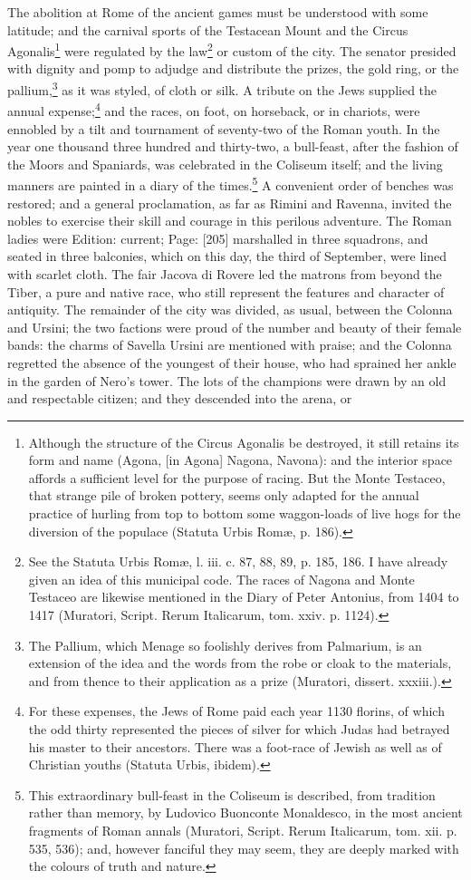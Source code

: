 The abolition at Rome of the ancient games must be understood with some latitude; and the carnival sports of the Testacean Mount and the Circus Agonalis\footnote{Although the structure of the Circus Agonalis be destroyed, it still retains its form and name (Agona, [in Agona] Nagona, Navona): and the interior space affords a sufficient level for the purpose of racing. But the Monte Testaceo, that strange pile of broken pottery, seems only adapted for the annual practice of hurling from top to bottom some waggon-loads of live hogs for the diversion of the populace (Statuta Urbis Romæ, p. 186).} were regulated by the law\footnote{See the Statuta Urbis Romæ, l. iii. c. 87, 88, 89, p. 185, 186. I have already given an idea of this municipal code. The races of Nagona and Monte Testaceo are likewise mentioned in the Diary of Peter Antonius, from 1404 to 1417 (Muratori, Script. Rerum Italicarum, tom. xxiv. p. 1124).} or custom of the city. The senator presided with dignity and pomp to adjudge and distribute the prizes, the gold ring, or the pallium,\footnote{The Pallium, which Menage so foolishly derives from Palmarium, is an extension of the idea and the words from the robe or cloak to the materials, and from thence to their application as a prize (Muratori, dissert. xxxiii.).} as it was styled, of cloth or silk. A tribute on the Jews supplied the annual expense;\footnote{For these expenses, the Jews of Rome paid each year 1130 florins, of which the odd thirty represented the pieces of silver for which Judas had betrayed his master to their ancestors. There was a foot-race of Jewish as well as of Christian youths (Statuta Urbis, ibidem).} and the races, on foot, on horseback, or in chariots, were ennobled by a tilt and tournament of seventy-two of the Roman youth. In the year one thousand three hundred and thirty-two, a bull-feast, after the fashion of the Moors and Spaniards, was celebrated in the Coliseum itself; and the living manners are painted in a diary of the times.\footnote{This extraordinary bull-feast in the Coliseum is described, from tradition rather than memory, by Ludovico Buonconte Monaldesco, in the most ancient fragments of Roman annals (Muratori, Script. Rerum Italicarum, tom. xii. p. 535, 536); and, however fanciful they may seem, they are deeply marked with the colours of truth and nature.} A convenient order of benches was restored; and a general proclamation, as far as Rimini and Ravenna, invited the nobles to exercise their skill and courage in this perilous adventure. The Roman ladies were Edition: current; Page: [205] marshalled in three squadrons, and seated in three balconies, which on this day, the third of September, were lined with scarlet cloth. The fair Jacova di Rovere led the matrons from beyond the Tiber, a pure and native race, who still represent the features and character of antiquity. The remainder of the city was divided, as usual, between the Colonna and Ursini; the two factions were proud of the number and beauty of their female bands: the charms of Savella Ursini are mentioned with praise; and the Colonna regretted the absence of the youngest of their house, who had sprained her ankle in the garden of Nero\texthebrew{}’s tower. The lots of the champions were drawn by an old and respectable citizen; and they descended into the arena, or 